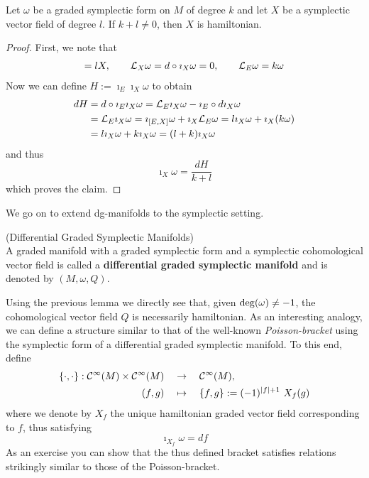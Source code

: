 \begin{lem}
  Let $\omega$ be a graded symplectic form on $M$ of degree $k$ and let $X$ be a symplectic vector field of degree $l$. If $k+l \neq 0$, then $X$ is hamiltonian.

\begin{proof}
  First, we note that
  \begin{align}
    [E,X] = lX, \quad \quad \lie{X}\omega = d \circ \imath_X \omega = 0, \quad \quad \lie{E}\omega = k\omega
  \end{align}
  Now we can define $H:=\imath_E\imath_X \omega$ to obtain
  \begin{align}
    dH &= d \circ \imath_E\imath_X \omega = \mathcal{L}_{E}\imath_X\omega - \imath_E \circ d\imath_X\omega\\
    &= \mathcal{L}_{E}\imath_X \omega = \imath_{[E,X]} \omega + \imath_X \mathcal{L}_{E}\omega = l \imath_X\omega + \imath_X(k\omega)\\
    &= l \imath_X\omega + k \imath_X \omega = (l+k) \imath_X \omega
  \end{align}
  and thus
  $$ \imath_X\omega = \frac{dH}{k+l} $$
  which proves the claim.
\end{proof}
\end{lem}

We go on to extend dg-manifolds to the symplectic setting.

\begin{definition} (Differential Graded Symplectic Manifolds)\\
  A graded manifold with a graded symplectic form and a symplectic cohomological vector field is called a \textbf{differential graded symplectic manifold} and is denoted by $(M, \omega, Q)$.
\end{definition}

Using the previous lemma we directly see that, given $\operatorname{deg}(\omega) \neq -1$, the cohomological vector field $Q$ is necessarily hamiltonian. As an interesting analogy, we can define a structure similar to that of the well-known \emph{Poisson-bracket} using the symplectic form of a differential graded symplectic manifold. To this end, define
\begin{align}
  \{\cdot, \cdot \} : \mathcal{C}^{\infty}(M) \times \mathcal{C}^{\infty}(M) \quad &\rightarrow \quad \mathcal{C}^{\infty}(M),\\
  (f,g) \quad &\mapsto \quad \{f,g\} := (-1)^{|f|+1} \ X_f(g)
\end{align}
where we denote by $X_f$ the unique hamiltonian graded vector field corresponding to $f$, thus satisfying
$$ \imath_{X_f}\omega = df $$
As an exercise you can show that the thus defined bracket satisfies relations strikingly similar to those of the Poisson-bracket.\\

